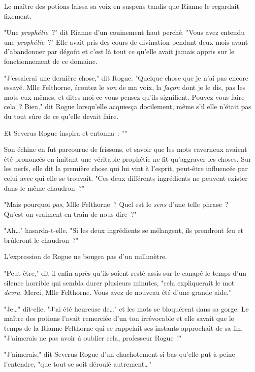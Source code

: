 Le maître des potions laissa sa voix en suspens tandis que Rianne le regardait fixement.

"Une \emph{prophétie}~?" dit Rianne d'un couinement haut perché. "Vous avez entendu une \emph{prophétie}~?" Elle avait pris des cours de divination pendant deux mois avant d'abandonner par dégoût et c'est là tout ce qu'elle avait jamais appris sur le fonctionnement de ce domaine.

"J'essaierai une dernière chose," dit Rogue. "Quelque chose que je n'ai pas encore essayé. Mlle Felthorne, écoutez le \emph{son} de ma voix, la \emph{façon} dont je le dis, pas les mots eux-mêmes, et dites-moi ce vous pensez qu'ils signifient. Pouvez-vous faire cela~? Bien," dit Rogue lorsqu'elle acquiesça docilement, même s'il elle n'était pas du tout sûre de ce qu'elle devait faire.

Et Severus Rogue inspira et entonna~: ""

Son échine en fut parcourue de frissons, et savoir que les mots caverneux avaient été prononcés en imitant une véritable prophétie ne fit qu'aggraver les choses. Sur les nerfs, elle dit la première chose qui lui vint à l'esprit, peut-être influencée par celui avec qui elle se trouvait. "Ces deux différents ingrédients ne peuvent exister dans le même chaudron~?"

"Mais pourquoi \emph{pas}, Mlle Felthorne~? Quel est le \emph{sens} d'une telle phrase~? Qu'est-on vraiment en train de nous dire~?"

"Ah…" hasarda-t-elle. "Si les deux ingrédients se mélangent, ils prendront feu et brûleront le chaudron~?"

L'expression de Rogue ne bougea pas d'un millimètre.

"Peut-être," dit-il enfin après qu'ils soient resté assis sur le canapé le temps d'un silence horrible qui sembla durer plusieurs minutes, "cela expliquerait le mot \emph{devra}. Merci, Mlle Felthorne. Vous avez de nouveau été d'une grande aide."

"Je…" dit-elle. "J'ai été heureuse de…" et les mots se bloquèrent dans sa gorge. Le maître des potions l'avait remerciée d'un ton irrévocable et elle savait que le temps de la Rianne Felthorne qui se rappelait ses instants approchait de sa fin. "J'aimerais ne pas avoir à oublier cela, professeur Rogue~!"

"J'aimerais," dit Severus Rogue d'un chuchotement si bas qu'elle put à peine l'entendre, "que tout se soit déroulé autrement…"

